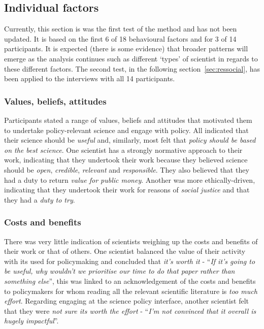 \subsection{Individual factors}\label{sec:resindividual}

Currently, this section is was the first test of the method and has not been updated. It is based on the first 6 of 18 behavioural factors and for 3 of 14 participants. It is expected (there is some evidence) that broader patterns will emerge as the analysis continues such as different `types' of scientist in regards to these different factors. The second test, in the following section~\ref{sec:ressocial}, has been applied to the interviews with all 14 participants.

\subsubsection{Values, beliefs, attitudes}\label{sec:resismvalues}
Participants stated a range of values, beliefs and attitudes that motivated them to undertake policy-relevant science and engage with policy. All indicated that their science should be \emph{useful} and, similarly, most felt that \emph{policy should be based on the best science}. One scientist has a strongly normative approach to their work, indicating that they undertook their work because they believed science should be \emph{open}, \emph{credible}, \emph{relevant} and \emph{responsible}. They also believed that they had a duty to return \emph{value for public money}. Another was more ethically-driven, indicating that they undertook their work for reasons of \emph{social justice} and that they had a \emph{duty to try}.  

\subsubsection{Costs and benefits}\label{sec:resismcab}
There was very little indication of scientists weighing up the costs and benefits of their work or that of others. One scientist balanced the value of their activity with its used for policymaking and concluded that \emph{it's worth it} - ``\emph{If it's going to be useful, why wouldn't we prioritise our time to do that paper rather than something else}'', this was linked to an acknowledgement of the costs and benefits to policymakers for whom reading all the relevant scientific literature is \emph{too much effort}. Regarding engaging at the science policy interface, another scientist felt that they were \emph{not sure its worth the effort} - ``\emph{I'm not convinced that it overall is hugely impactful}''.


